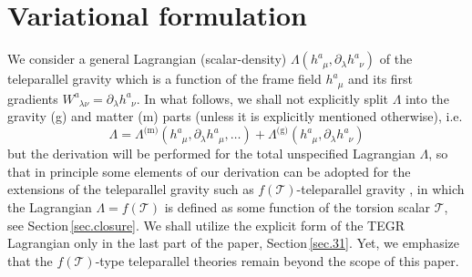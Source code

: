 \documentclass[
10pt, %
a4paper, %
oneside, %
twocolumn,
headinclude,footinclude, %
BCOR5mm, %
]{scrartcl}
\newcommand{\pd}[1]{\partial_{#1}}
\newcommand{\tetrsymbol}{h}
\newcommand{\tetr}[2]{\tetrsymbol^{#1}_{\phantom{#1}#2}}
\newcommand{\w}[2]{W^{#1}_{\phantom{#1}#2}}
\newcommand{\Lag}{\Lambda}	%
\newcommand{\LCsymb}{\bm{\in}}    %
\newcommand{\LCtens}{\varepsilon} %
\newcommand{\Tscal}{\mathcal{T}}		%
\begin{document}
	
	
	
	
	\section{Variational formulation}\label{sec.SAP}
	
	We consider a general Lagrangian (scalar-density) $ 
	\Lag(\tetr{a}{\mu},\pd{\lambda}\tetr{a}{\nu}) $ 
	of the teleparallel gravity which is a function of the frame field $ \tetr{a}{\mu} $ and its 
	first 
	gradients $ \w{a}{\lambda\nu} = \pd{\lambda}\tetr{a}{\nu} $. In what follows, we shall not 
	explicitly split $ \Lag $ 
	into the gravity (g) and matter (m) parts (unless it is explicitly mentioned otherwise), i.e. 
	\begin{equation}\label{eqn.Lagr.split}
		\Lag = \Lag^\text{(m)}(\tetr{a}{\mu},\pd{\lambda}\tetr{a}{\mu},\ldots) + 
		\Lag^\text{(g)}(\tetr{a}{\mu},\pd{\lambda}\tetr{a}{\nu}) 
	\end{equation}
	but the derivation will be performed for the total unspecified Lagrangian $
	\Lag $, so that in principle some elements of our derivation can be adopted
	for the extensions of the teleparallel gravity such as $ f(\Tscal)
	$-teleparallel gravity \cite{li2011d,li2011e,ferraro2018,blagojevic2020}, in
	which the Lagrangian $ \Lag = f(\Tscal) $ is defined as some function of the
	torsion scalar $ \Tscal $, see Section\,\ref{sec.closure}. We shall utilize
	the explicit form of the TEGR Lagrangian only in the last part of the paper,
	Section\,\ref{sec.31}. Yet, we emphasize that the $f(\Tscal)$-type
	teleparallel theories remain beyond the scope of this paper. 
	
\end{document}

